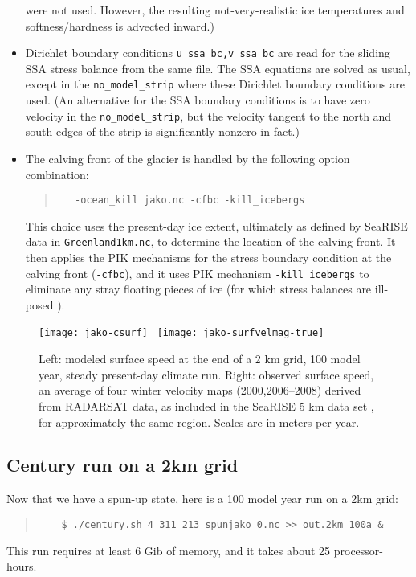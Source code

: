 \begin{itemize}
\begin{quote}
\normalsize\end{quote}
were not used.  However, the resulting not-very-realistic ice temperatures and softness/hardness is advected inward.)
\item Dirichlet boundary conditions \verb|u_ssa_bc,v_ssa_bc| are read for the sliding SSA stress balance from the same file.  The SSA equations are solved as usual, except in the \verb|no_model_strip| where these Dirichlet boundary conditions are used.  (An alternative for the SSA boundary conditions is to have zero velocity in the \verb|no_model_strip|, but the velocity tangent to the north and south edges of the strip is significantly nonzero in fact.)
\item The calving front of the glacier is handled by the following option combination:
\begin{quote}\small
\begin{verbatim}
   -ocean_kill jako.nc -cfbc -kill_icebergs
\end{verbatim}
\normalsize\end{quote}
This choice uses the present-day ice extent, ultimately as defined by SeaRISE data in \verb|Greenland1km.nc|, to determine the location of the calving front.  It then applies the PIK mechanisms for the stress boundary condition at the calving front (\verb|-cfbc|), and it uses PIK mechanism \verb|-kill_icebergs| to eliminate any stray floating pieces of ice (for which stress balances are ill-posed \cite{Winkelmannetal2011}).
\end{itemize}


\begin{figure}[ht]
  \centering
  \texttt{[image: jako-csurf]} \, \texttt{[image: jako-surfvelmag-true]}
  \caption{Left: modeled surface speed at the end of a 2 km grid, 100 model year, steady present-day climate run.  Right: observed surface speed, an average of four winter velocity maps (2000,2006--2008) derived from RADARSAT data, as included in the SeaRISE  5 km data set \cite{Joughinetal2010}, for approximately the same region.  Scales are in meters per year.}
  \label{fig:jako-csurf}
\end{figure}


\subsection*{Century run on a 2km grid}
Now that we have a spun-up state, here is a 100 model year run on a 2km grid:
\begin{quote}\small
\begin{verbatim}
    $ ./century.sh 4 311 213 spunjako_0.nc >> out.2km_100a &
\end{verbatim}
\normalsize\end{quote}
This run requires at least 6 Gib of memory, and it takes about 25 processor-hours.


